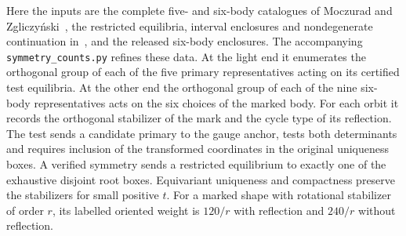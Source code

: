 \documentclass[11pt]{article}
\begin{document}
Here the inputs are the complete five- and six-body catalogues of
Moczurad and Zgliczy\'nski~\cite{MZ}, the restricted equilibria,
interval enclosures and nondegenerate continuation in~\cite{Small}, and
the released six-body enclosures. The accompanying
\texttt{symmetry\_counts.py} refines these data. At the light end it
enumerates the orthogonal group of each of the five primary
representatives acting on its certified test equilibria. At the other end
the orthogonal group of each of the nine six-body representatives acts on
the six choices of the marked body. For each orbit it records the
orthogonal stabilizer of the mark and the cycle type of its reflection.
The test sends a candidate primary to the gauge anchor, tests both
determinants and requires inclusion of the transformed coordinates in
the original uniqueness boxes. A verified symmetry sends a restricted
equilibrium to exactly one of the exhaustive disjoint root boxes.
Equivariant uniqueness and compactness preserve the stabilizers for
small positive $t$. For a marked shape with rotational stabilizer of
order $r$, its labelled oriented weight is $120/r$ with reflection and
$240/r$ without reflection.
\end{document}
